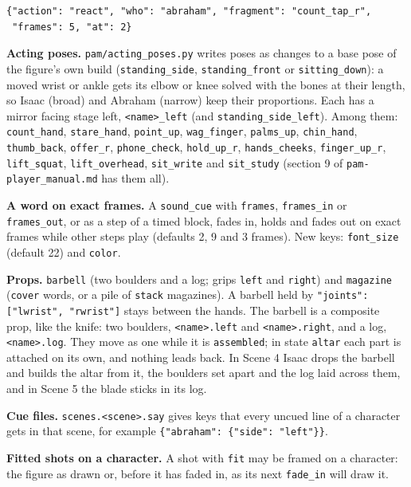 \documentclass[
  12pt,
  letterpaper,
]{book}
\begin{document}
\begin{verbatim}
{"action": "react", "who": "abraham", "fragment": "count_tap_r",
 "frames": 5, "at": 2}
\end{verbatim}

\textbf{Acting poses.} \texttt{pam/acting\_poses.py} writes poses as
changes to a base pose of the figure's own build (\texttt{standing\_side},
\texttt{standing\_front} or \texttt{sitting\_down}): a moved wrist or
ankle gets its elbow or knee solved with the bones at their length, so
Isaac (broad) and Abraham (narrow) keep their proportions. Each has a
mirror facing stage left, \texttt{<name>\_left} (and
\texttt{standing\_side\_left}). Among them: \texttt{count\_hand},
\texttt{stare\_hand}, \texttt{point\_up}, \texttt{wag\_finger},
\texttt{palms\_up}, \texttt{chin\_hand}, \texttt{thumb\_back},
\texttt{offer\_r}, \texttt{phone\_check}, \texttt{hold\_up\_r},
\texttt{hands\_cheeks}, \texttt{finger\_up\_r}, \texttt{lift\_squat},
\texttt{lift\_overhead}, \texttt{sit\_write} and \texttt{sit\_study}
(section 9 of \texttt{pam-player\_manual.md} has them all).

\textbf{A word on exact frames.} A \texttt{sound\_cue} with
\texttt{frames}, \texttt{frames\_in} or \texttt{frames\_out}, or as a
step of a timed block, fades in, holds and fades out on exact frames
while other steps play (defaults 2, 9 and 3 frames). New keys:
\texttt{font\_size} (default 22) and \texttt{color}.

\textbf{Props.} \texttt{barbell} (two boulders and a log; grips
\texttt{left} and \texttt{right}) and \texttt{magazine} (\texttt{cover}
words, or a pile of \texttt{stack} magazines). A barbell held by
\texttt{"joints": ["lwrist", "rwrist"]} stays between the hands. The
barbell is a composite prop, like the knife: two boulders,
\texttt{<name>.left} and \texttt{<name>.right}, and a log,
\texttt{<name>.log}. They move as one while it is \texttt{assembled};
in state \texttt{altar} each part is attached on its own, and nothing
leads back. In Scene 4 Isaac drops the barbell and builds the altar from
it, the boulders set apart and the log laid across them, and in Scene 5
the blade sticks in its log.

\textbf{Cue files.} \texttt{scenes.<scene>.say} gives keys that every
uncued line of a character gets in that scene, for example
\texttt{\{"abraham": \{"side": "left"\}\}}.

\textbf{Fitted shots on a character.} A shot with \texttt{fit} may be
framed on a character: the figure as drawn or, before it has faded in,
as its next \texttt{fade\_in} will draw it.
\end{document}
